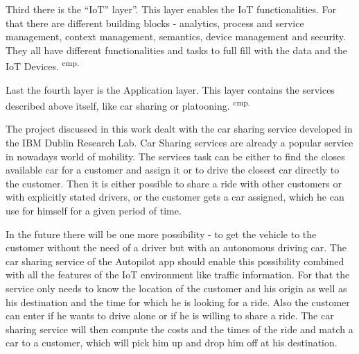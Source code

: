 Third there is the ``IoT'' layer''. This layer enables the IoT functionalities. For that there are different building blocks - analytics, process and service management, context management, semantics, device management and security. They all have different functionalities and tasks to full fill with the data and the IoT Devices. \textsuperscript{cmp.\cite{5}}

Last the fourth layer is the Application layer. This layer contains the services described above itself, like car sharing or platooning. \textsuperscript{cmp.\cite{28}}


The project discussed in this work dealt with the car sharing service developed in the IBM Dublin Research Lab. Car Sharing services are already a popular service in nowadays world of mobility. The services task can be either to find the closes available car for a customer and assign it or to drive the closest car directly to the customer. Then it is either possible to share a ride with other customers or with explicitly stated drivers, or the customer gets a car assigned, which he can use for himself for a given period of time.

In the future there will be one more possibility - to get the vehicle to the customer without the need of a driver but with an autonomous driving car. The car sharing service of the Autopilot app should enable this possibility combined with all the features of the IoT environment like traffic information. For that the service only needs to know the location of the customer and his origin as well as his destination and the time for which he is looking for a ride. Also the customer can enter if he wants to drive alone or if he is willing to share a ride. The car sharing service will then compute the costs and the times of the ride and match a car to a customer, which will pick him up and drop him off at his destination.

